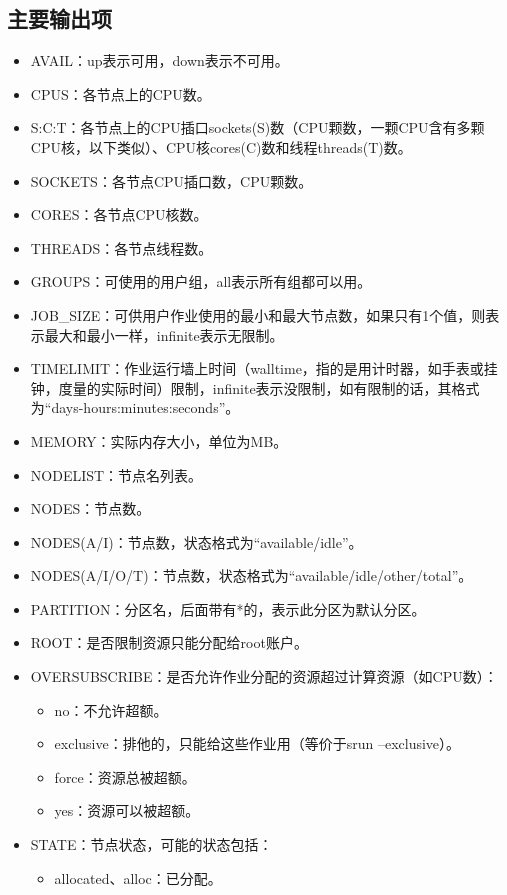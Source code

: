 \subsection{主要输出项}
\begin{itemize}
	\item AVAIL：up表示可用，down表示不可用。
    \item CPUS：各节点上的CPU数。
    \item S:C:T：各节点上的CPU插口sockets(S)数（CPU颗数，一颗CPU含有多颗CPU核，以下类似）、CPU核cores(C)数和线程threads(T)数。
    \item SOCKETS：各节点CPU插口数，CPU颗数。
    \item CORES：各节点CPU核数。
    \item THREADS：各节点线程数。
    \item GROUPS：可使用的用户组，all表示所有组都可以用。
	\item JOB\_SIZE：可供用户作业使用的最小和最大节点数，如果只有1个值，则表示最大和最小一样，infinite表示无限制。
	\item TIMELIMIT：作业运行墙上时间（walltime，指的是用计时器，如手表或挂钟，度量的实际时间）限制，infinite表示没限制，如有限制的话，其格式为``days-hours:minutes:seconds''。
    \item MEMORY：实际内存大小，单位为MB。
    \item NODELIST：节点名列表。
    \item NODES：节点数。
    \item NODES(A/I)：节点数，状态格式为``available/idle''。
    \item NODES(A/I/O/T)：节点数，状态格式为``available/idle/other/total''。
	\item PARTITION：分区名，后面带有*的，表示此分区为默认分区。
    \item ROOT：是否限制资源只能分配给root账户。
    \item OVERSUBSCRIBE：是否允许作业分配的资源超过计算资源（如CPU数）：
	\begin{itemize}
		\item no：不允许超额。
		\item exclusive：排他的，只能给这些作业用（等价于srun --exclusive）。
		\item force：资源总被超额。
		\item yes：资源可以被超额。
	\end{itemize}
     \item STATE：节点状态，可能的状态包括：
\begin{itemize}
	\item	allocated、alloc：已分配。

\end{itemize}
\end{itemize}
